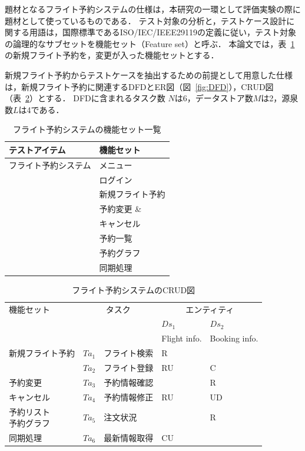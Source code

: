 題材となるフライト予約システムの仕様は，本研究の一環として評価実験の際に題材として使っているものである\cite{Yumo2014}．
テスト対象の分析と，テストケース設計に関する用語は，国際標準であるISO/IEC/IEEE29119の定義に従い，テスト対象の論理的なサブセットを機能セット（Feature set）と呼ぶ\cite{29119}．%
本論文では，表~\ref{Featurelist}の新規フライト予約を，変更が入った機能セットとする．


新規フライト予約からテストケースを抽出するための前提として用意した仕様は，新規フライト予約に関連するDFDとER図（図~\ref{fig:DFD}），CRUD図（表~\ref{CRUD}）とする．
DFDに含まれるタスク数 $N$は6，データストア数$M$は2，源泉数$L$は4である．

\begin{table}[t]
\caption{フライト予約システムの機能セット一覧}
\label{Featurelist}
\begin{center}
\begin{tabular}{l|l}
\hline
テストアイテム&機能セット
\\
\hline\hline
フライト予約システム&メニュー\\
\cline{2-2}
&ログイン\\
\cline{2-2}
&新規フライト予約\\
\cline{2-2}
&予約変更 \&\\
&キャンセル\\
\cline{2-2}
&予約一覧\\
\cline{2-2}
&予約グラフ\\
\cline{2-2}
&同期処理\\
\hline
\end{tabular}
\end{center}
\end{table}

\begin{table}[t]
\caption{フライト予約システムのCRUD図}
\label{CRUD}
\begin{center}
{\footnotesize
\begin{tabular}{p{1.7 cm}|c|p{1.5 cm}||p{1 cm}|p{1cm}}
\hline
機能セット&\multicolumn{2}{c||}{タスク}&\multicolumn{2}{c}{エンティティ}\\
&\multicolumn{2}{c||}{}&$Ds_1$&$Ds_2$\\
&\multicolumn{2}{c||}{}&Flight info.&Booking info.\\
\cline{4-5}
\hline\hline
新規フライト予約&$Ta_1$&フライト検索&R&\\
\cline{2-5}
&$Ta_2$&フライト登録&RU&C\\
\hline
予約変更&$Ta_3$&予約情報確認&&R\\
\cline{2-5}
キャンセル&$Ta_4$&予約情報修正&RU&UD\\
\hline
\shortstack{予約リスト\\予約グラフ}&$Ta_5$&注文状況&&R\\
\hline
\cline{2-5}
同期処理&$Ta_6$&最新情報取得&CU&\\
\hline
\end{tabular}
}
\end{center}
\end{table}%

